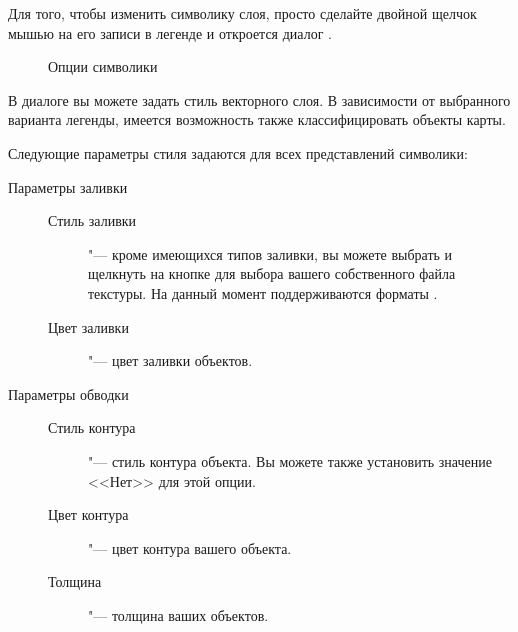 Для того, чтобы изменить символику слоя, просто сделайте двойной щелчок
мышью на его записи в легенде и откроется диалог .

\begin{figure}[ht]
\centering
   \hspace{1cm}
   \hspace{1cm}
   \hspace{1cm}
\caption{Опции символики \wincaption}
\end{figure}

 \label{sec:style_options} 
В диалоге вы можете задать стиль векторного слоя. В зависимости от
выбранного варианта легенды, имеется возможность также классифицировать
объекты карты.

Следующие параметры стиля задаются для всех представлений символики:
\begin{description}
\item[Параметры заливки]
\begin{description}
 \item[Стиль заливки] "--- кроме имеющихся типов заливки, вы
 можете выбрать  и щелкнуть на
 кнопке \browsebutton для выбора вашего собственного файла текстуры. На
 данный момент поддерживаются форматы .
 \item[Цвет заливки] "--- цвет заливки объектов.
\end{description}
\item[Параметры обводки]
\begin{description}
 \item[Стиль контура] "--- стиль контура объекта. Вы можете
 также установить значение <<Нет>> для этой опции.
 \item[Цвет контура] "--- цвет контура вашего объекта.
 \item[Толщина] "--- толщина ваших объектов.
\end{description}
\end{description}

